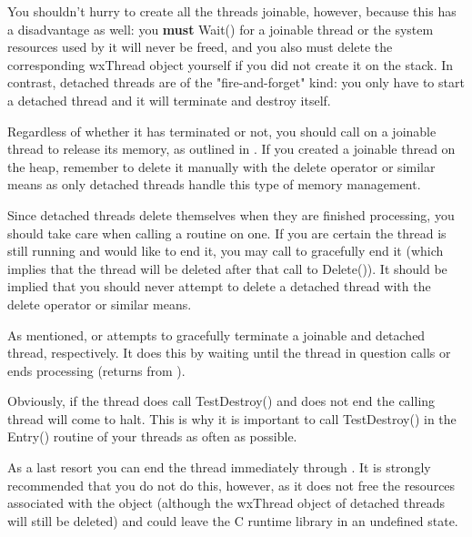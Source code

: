 You shouldn't hurry to create all the threads joinable, however, because this
has a disadvantage as well: you {\bf must} Wait() for a joinable thread or the
system resources used by it will never be freed, and you also must delete the
corresponding wxThread object yourself if you did not create it on the stack. In 
contrast, detached threads are of the "fire-and-forget" kind: you only have to start 
a detached thread and it will terminate and destroy itself.

\label{deletionwxthread}

Regardless of whether it has terminated or not, you should call 
 on a joinable thread to release its
memory, as outlined in . If you created
a joinable thread on the heap, remember to delete it manually with the delete 
operator or similar means as only detached threads handle this type of memory 
management.

Since detached threads delete themselves when they are finished processing,
you should take care when calling a routine on one. If you are certain the 
thread is still running and would like to end it, you may call 
 to gracefully end it (which implies
that the thread will be deleted after that call to Delete()). It should be
implied that you should never attempt to delete a detached thread with the 
delete operator or similar means. 

As mentioned,  or 
 attempts to gracefully terminate
a joinable and detached thread, respectively. It does this by waiting until
the thread in question calls 
or ends processing (returns from ).

Obviously, if the thread does call TestDestroy() and does not end the calling
thread will come to halt. This is why it is important to call TestDestroy() in
the Entry() routine of your threads as often as possible.

As a last resort you can end the thread immediately through 
. It is strongly recommended that you
do not do this, however, as it does not free the resources associated with
the object (although the wxThread object of detached threads will still be
deleted) and could leave the C runtime library in an undefined state.


